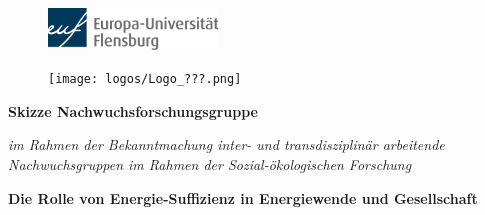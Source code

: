 
\thispagestyle{empty}
\begin{center}

\begin{figure}[htb]
    \centering
    \begin{minipage}[c]{0.4\linewidth}
        \centering
        \includegraphics[width=4.5cm]{logos/europa-universitaet-flensburg-hauptlogo-rgb-600dpi.png}
    \end{minipage}
    \hfill
    \begin{minipage}[c]{0.4\linewidth}
        \centering
        \texttt{[image: logos/Logo\_???.png]}
    \end{minipage}
\end{figure}

\vspace*{1 cm}

{\LARGE\textbf{\textsf{Skizze Nachwuchsforschungsgruppe}}

\textsf{\textit{im Rahmen der Bekanntmachung \glqq inter- und transdisziplinär arbeitende Nachwuchsgruppen im Rahmen der Sozial-ökologischen Forschung\grqq} }
}

\vspace{0.5cm}

{\Huge
\textbf{\textsf{Die Rolle von Energie-Suffizienz in Energiewende und Gesellschaft\\
}}

}
\end{center}
